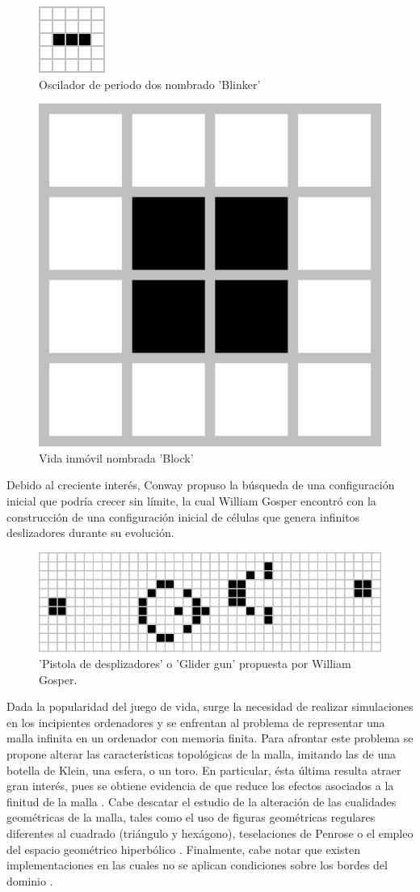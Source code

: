 \documentclass[../proyecto.tex]{book}
\begin{document}
\begin{figure}[H]
	\centering
	\includegraphics[height=.15\linewidth]{./images/blinker.png}
	\caption{Oscilador de periodo dos nombrado 'Blinker'}
\end{figure} 
\begin{figure}[H]
	
	\centering
	\includegraphics[height=.15\linewidth]{./images/block.png}
	\caption{Vida inmóvil nombrada 'Block'}
\end{figure} 

Debido al creciente interés, Conway propuso la búsqueda de una configuración inicial que podría crecer sin límite, la cual William Gosper encontró con la construcción de una configuración inicial de células que genera infinitos deslizadores durante su evolución. 

\begin{figure}[H]
	
	\centering
	\includegraphics[scale=0.55]{./images/glider_gun.png}
	\caption{'Pistola de desplizadores' o 'Glider gun' propuesta por William Gosper.}
	
\end{figure} 

Dada la popularidad del juego de vida, surge la necesidad de realizar simulaciones en los incipientes ordenadores y se enfrentan al problema de representar una malla infinita en un ordenador con memoria finita. Para afrontar este problema se propone alterar las características topológicas de la malla, imitando las de una botella de Klein, una esfera, o un toro. En particular, ésta última resulta atraer gran interés, pues se obtiene evidencia de que reduce los efectos asociados a la finitud de la malla \cite{finitudMalla, finitudMalla2}. Cabe descatar el estudio de la alteración de las cualidades geométricas de la malla, tales como el uso de figuras geométricas regulares diferentes al cuadrado (triángulo y hexágono)\cite{triangular}, teselaciones de Penrose \cite{penrose} o el empleo del espacio geométrico hiperbólico \cite{hiperbolico}. Finalmente, cabe notar que existen implementaciones en las cuales no se aplican condiciones sobre los bordes del dominio \cite{boardless}.
\end{document}
